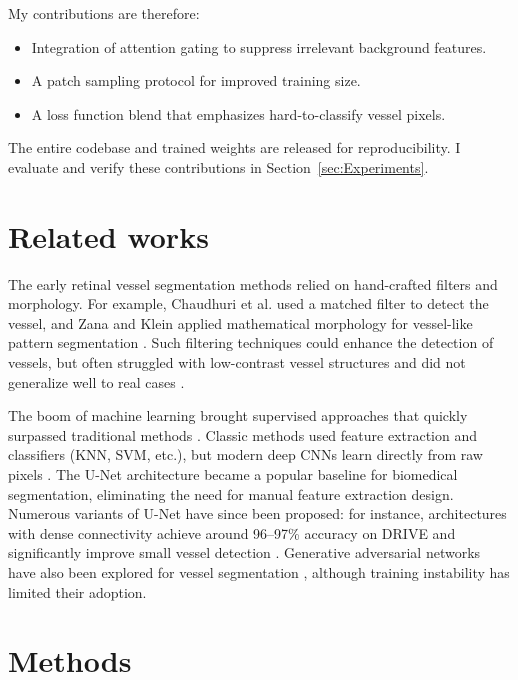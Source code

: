 \documentclass[11pt]{article}
\begin{document}
My contributions are therefore: 
\begin{itemize}
  \item Integration of attention gating to suppress irrelevant background features.
  \item A patch sampling protocol for improved training size.
  \item A loss function blend that emphasizes hard-to-classify vessel pixels.
\end{itemize}

The entire codebase and trained weights are released for reproducibility.  
I evaluate and verify these contributions in Section~\ref{sec:Experiments}.

\section{Related works}
\label{sec:Related}

The early retinal vessel segmentation methods relied on hand-crafted filters and morphology. For example, Chaudhuri et al. used a matched filter to detect the vessel, \cite{chaudhuri1989detection} and Zana and Klein applied mathematical morphology for vessel-like pattern segmentation \cite{zana2001segmentation}. Such filtering techniques could enhance the detection of vessels, but often struggled with low-contrast vessel structures and did not generalize well to real cases \cite{galdran2022state}.

The boom of machine learning brought supervised approaches that quickly surpassed traditional methods \cite{galdran2022state}. Classic methods used feature extraction and classifiers (KNN, SVM, etc.), but modern deep CNNs learn directly from raw pixels \cite{salem2006segmentation}. The U-Net architecture \cite{ronneberger2015u} became a popular baseline for biomedical segmentation, eliminating the need for manual feature extraction design. Numerous variants of U-Net have since been proposed: for instance, architectures with dense connectivity achieve around 96–97\% accuracy on DRIVE and significantly improve small vessel detection \cite{li2021blood}. Generative adversarial networks have also been explored for vessel segmentation \cite{galdran2022state}, although training instability has limited their adoption.

\section{Methods}
\label{sec:Methods}
\end{document}
